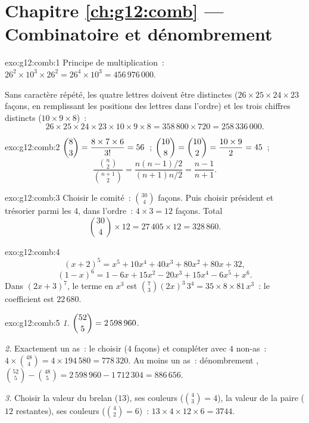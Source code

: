 \section*{Chapitre \ref{ch:g12:comb} --- Combinatoire et dénombrement}

\begin{solution}{exo:g12:comb:1}
Principe de multiplication~:
$26^2 \times 10^3 \times 26^2 = 26^4 \times 10^3 = 456\,976\,000$.

Sans caractère répété, les quatre lettres doivent être distinctes
($26 \times 25 \times 24 \times 23$ façons, en remplissant les positions
des lettres dans l'ordre) et les trois chiffres distincts
($10 \times 9 \times 8$)~:
\[
26 \times 25 \times 24 \times 23 \times 10 \times 9 \times 8
= 358\,800 \times 720 = 258\,336\,000 .
\]
\end{solution}

\begin{solution}{exo:g12:comb:2}
$\dbinom83 = \dfrac{8 \times 7 \times 6}{3!} = 56$~;
$\dbinom{10}{8} = \dbinom{10}{2} = \dfrac{10 \times 9}{2} = 45$~;
\[
\frac{\binom n2}{\binom{n+1}2}
= \frac{n(n-1)/2}{(n+1)n/2} = \frac{n-1}{n+1}.
\]
\end{solution}

\begin{solution}{exo:g12:comb:3}
Choisir le comité~: $\binom{30}{4}$ façons. Puis choisir président et
trésorier parmi les 4, dans l'ordre~: $4 \times 3 = 12$ façons. Total
\[
\binom{30}{4} \times 12 = 27\,405 \times 12 = 328\,860 .
\]
\end{solution}

\begin{solution}{exo:g12:comb:4}
\[
(x+2)^5 = x^5 + 10x^4 + 40x^3 + 80x^2 + 80x + 32 ,
\]
\[
(1-x)^6 = 1 - 6x + 15x^2 - 20x^3 + 15x^4 - 6x^5 + x^6 .
\]
Dans $(2x+3)^7$, le terme en $x^3$ est
$\binom{7}{3}(2x)^3\,3^4 = 35 \times 8 \times 81\, x^3$~: le coefficient
est $22\,680$.
\end{solution}

\begin{solution}{exo:g12:comb:5}
\emph{1.} $\dbinom{52}{5} = 2\,598\,960$.

\emph{2.} Exactement un as~: le choisir ($4$ façons) et compléter avec
$4$ non-as~: $4 \times \binom{48}{4} = 4 \times 194\,580 = 778\,320$.
Au moins un as~: dénombrement ,
$\binom{52}{5} - \binom{48}{5} = 2\,598\,960 - 1\,712\,304 = 886\,656$.

\emph{3.} Choisir la valeur du brelan ($13$), ses couleurs
($\binom43 = 4$), la valeur de la paire ($12$ restantes), ses couleurs
($\binom42 = 6$)~:
$13 \times 4 \times 12 \times 6 = 3744$.
\end{solution}

